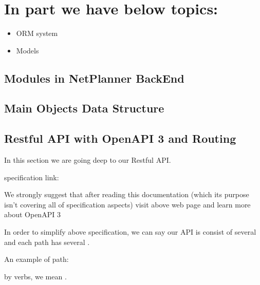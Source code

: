 \documentclass[letterpaper,10pt,english]{sphinxmanual}
\begin{document}
\chapter{In  part we have below topics:}
\label{\detokenize{index:in-database-part-we-have-below-topics}}\begin{itemize}
\item {} 
ORM system

\item {} 
Models

\end{itemize}


\section{Modules in NetPlanner BackEnd}
\label{\detokenize{modules:modules-in-netplanner-backend}}\label{\detokenize{modules::doc}}

\section{Main Objects Data Structure}
\label{\detokenize{ObjectDataStructures:main-objects-data-structure}}\label{\detokenize{ObjectDataStructures::doc}}

\section{Restful API with OpenAPI 3 and Routing}
\label{\detokenize{RestAPI:restful-api-with-openapi-3-and-routing}}\label{\detokenize{RestAPI::doc}}
In this section we are going deep to our Restful API.

specification link: 

We strongly suggest that after reading this documentation (which its purpose isn’t covering all of specification aspects) visit above web page
and learn more about OpenAPI 3

In order to simplify above specification, we can say our API is consist of several 
and each path has several .
\begin{description}
\item[{An example of path:}] \leavevmode
{}

\end{description}

by verbs, we mean .
\end{document}
